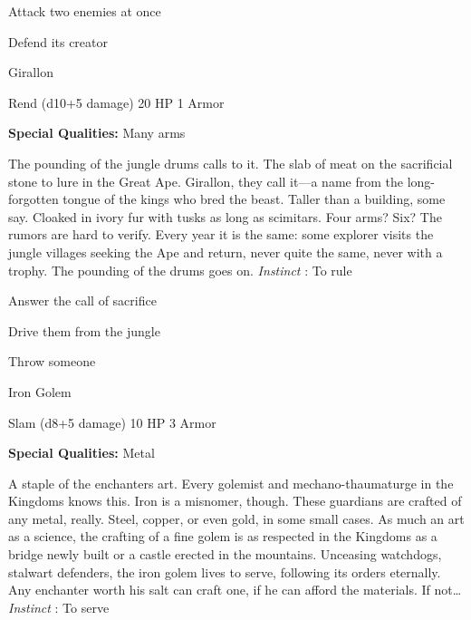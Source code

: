 \startitemize[1,packed]

\item Attack two enemies at once

 
\item Defend its creator


\stopitemize
 
\startMonsterName
Girallon	 
\stopMonsterName
 

Rend (d10+5 damage)	20 HP	1 Armor

 


 
\startMonsterQualities
{\bf Special Qualities:}  Many arms
\stopMonsterQualities
 
\startMonsterDescription
The pounding of the jungle drums calls to it. The slab of meat on the sacrificial stone to lure in the Great Ape. Girallon, they call it—a name from the long-forgotten tongue of the kings who bred the beast. Taller than a building, some say. Cloaked in ivory fur with tusks as long as scimitars. Four arms? Six? The rumors are hard to verify. Every year it is the same: some explorer visits the jungle villages seeking the Ape and return, never quite the same, never with a trophy. The pounding of the drums goes on. {\em Instinct} : To rule
\stopMonsterDescription
 
\startitemize[1,packed]

\item Answer the call of sacrifice

 
\item Drive them from the jungle

 
\item Throw someone


\stopitemize
 
\startMonsterName
Iron Golem	 
\stopMonsterName
 

Slam (d8+5 damage)	10 HP	3 Armor

 


 
\startMonsterQualities
{\bf Special Qualities:}  Metal
\stopMonsterQualities
 
\startMonsterDescription
A staple of the enchanters art. Every golemist and mechano-thaumaturge in the Kingdoms knows this. Iron is a misnomer, though. These guardians are crafted of any metal, really. Steel, copper, or even gold, in some small cases. As much an art as a science, the crafting of a fine golem is as respected in the Kingdoms as a bridge newly built or a castle erected in the mountains. Unceasing watchdogs, stalwart defenders, the iron golem lives to serve, following its orders eternally. Any enchanter worth his salt can craft one, if he can afford the materials. If not… {\em Instinct} : To serve
\stopMonsterDescription
 
